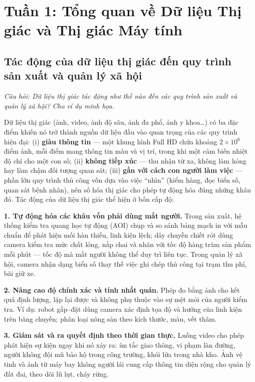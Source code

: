 \section{Tuần 1: Tổng quan về Dữ liệu Thị giác và Thị giác Máy tính}
\label{sec:week1}

\subsection{Tác động của dữ liệu thị giác đến quy trình sản xuất và quản lý xã hội}
\label{subsec:w1_impact}

\textit{Câu hỏi: Dữ liệu thị giác tác động như thế nào đến các quy trình sản xuất và quản lý xã hội? Cho ví dụ minh họa.}

Dữ liệu thị giác (ảnh, video, ảnh độ sâu, ảnh đa phổ, ảnh y khoa\ldots) có ba đặc điểm khiến nó trở thành nguồn dữ liệu đầu vào quan trọng của các quy trình hiện đại: (i) \textbf{giàu thông tin} — một khung hình Full HD chứa khoảng $2 \times 10^6$ điểm ảnh, mỗi điểm mang thông tin màu và vị trí, trong khi một cảm biến nhiệt độ chỉ cho một con số; (ii) \textbf{không tiếp xúc} — thu nhận từ xa, không làm hỏng hay làm chậm đối tượng quan sát; (iii) \textbf{gần với cách con người làm việc} — phần lớn quy trình thủ công vốn dựa vào việc ``nhìn'' (kiểm hàng, đọc biển số, quan sát bệnh nhân), nên số hóa thị giác cho phép tự động hóa đúng những khâu đó. Tác động của dữ liệu thị giác thể hiện ở bốn cấp độ:

\textbf{1. Tự động hóa các khâu vốn phải dùng mắt người.} Trong sản xuất, hệ thống kiểm tra quang học tự động (AOI) chụp và so sánh bảng mạch in với mẫu chuẩn để phát hiện mối hàn thiếu, linh kiện lệch; dây chuyền chiết rót dùng camera kiểm tra mức chất lỏng, nắp chai và nhãn với tốc độ hàng trăm sản phẩm mỗi phút — tốc độ mà mắt người không thể duy trì liên tục. Trong quản lý xã hội, camera nhận dạng biển số thay thế việc ghi chép thủ công tại trạm thu phí, bãi giữ xe.

\textbf{2. Nâng cao độ chính xác và tính nhất quán.} Phép đo bằng ảnh cho kết quả định lượng, lặp lại được và không phụ thuộc vào sự mệt mỏi của người kiểm tra. Ví dụ: robot gắp--đặt dùng camera xác định tọa độ và hướng của linh kiện trên băng chuyền; phân loại nông sản theo kích thước, màu, vết thâm.

\textbf{3. Giám sát và ra quyết định theo thời gian thực.} Luồng video cho phép phát hiện sự kiện ngay khi nó xảy ra: ùn tắc giao thông, vi phạm làn đường, người không đội mũ bảo hộ trong công trường, khói lửa trong nhà kho. Ảnh vệ tinh và ảnh từ máy bay không người lái cung cấp thông tin diện rộng cho quản lý đất đai, theo dõi lũ lụt, cháy rừng.

